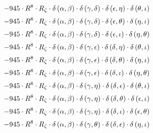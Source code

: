 \begin{subequations}
\begin{gather}
 \\[0.2em] \notag 		 - 945 \cdot R^{8} \cdot R_{\zeta{}} \cdot \delta{}\left(\alpha{}, \beta{}\right) \cdot \delta{}\left(\gamma{}, \delta{}\right) \cdot \delta{}\left(\epsilon{}, \eta{}\right) \cdot \delta{}\left(\theta{}, \iota{}\right) 
 \\[0.2em] \notag 		 - 945 \cdot R^{8} \cdot R_{\zeta{}} \cdot \delta{}\left(\alpha{}, \beta{}\right) \cdot \delta{}\left(\gamma{}, \delta{}\right) \cdot \delta{}\left(\epsilon{}, \theta{}\right) \cdot \delta{}\left(\eta{}, \iota{}\right) 
 \\[0.2em] \notag 		 - 945 \cdot R^{8} \cdot R_{\zeta{}} \cdot \delta{}\left(\alpha{}, \beta{}\right) \cdot \delta{}\left(\gamma{}, \delta{}\right) \cdot \delta{}\left(\epsilon{}, \iota{}\right) \cdot \delta{}\left(\eta{}, \theta{}\right) 
 \\[0.2em] \notag 		 - 945 \cdot R^{8} \cdot R_{\zeta{}} \cdot \delta{}\left(\alpha{}, \beta{}\right) \cdot \delta{}\left(\gamma{}, \epsilon{}\right) \cdot \delta{}\left(\delta{}, \eta{}\right) \cdot \delta{}\left(\theta{}, \iota{}\right) 
 \\[0.2em] \notag 		 - 945 \cdot R^{8} \cdot R_{\zeta{}} \cdot \delta{}\left(\alpha{}, \beta{}\right) \cdot \delta{}\left(\gamma{}, \epsilon{}\right) \cdot \delta{}\left(\delta{}, \theta{}\right) \cdot \delta{}\left(\eta{}, \iota{}\right) 
 \\[0.2em] \notag 		 - 945 \cdot R^{8} \cdot R_{\zeta{}} \cdot \delta{}\left(\alpha{}, \beta{}\right) \cdot \delta{}\left(\gamma{}, \epsilon{}\right) \cdot \delta{}\left(\delta{}, \iota{}\right) \cdot \delta{}\left(\eta{}, \theta{}\right) 
 \\[0.2em] \notag 		 - 945 \cdot R^{8} \cdot R_{\zeta{}} \cdot \delta{}\left(\alpha{}, \beta{}\right) \cdot \delta{}\left(\gamma{}, \eta{}\right) \cdot \delta{}\left(\delta{}, \epsilon{}\right) \cdot \delta{}\left(\theta{}, \iota{}\right) 
 \\[0.2em] \notag 		 - 945 \cdot R^{8} \cdot R_{\zeta{}} \cdot \delta{}\left(\alpha{}, \beta{}\right) \cdot \delta{}\left(\gamma{}, \eta{}\right) \cdot \delta{}\left(\delta{}, \theta{}\right) \cdot \delta{}\left(\epsilon{}, \iota{}\right) 
 \\[0.2em] \notag 		 - 945 \cdot R^{8} \cdot R_{\zeta{}} \cdot \delta{}\left(\alpha{}, \beta{}\right) \cdot \delta{}\left(\gamma{}, \eta{}\right) \cdot \delta{}\left(\delta{}, \iota{}\right) \cdot \delta{}\left(\epsilon{}, \theta{}\right) 
 \\[0.2em] \notag 		 - 945 \cdot R^{8} \cdot R_{\zeta{}} \cdot \delta{}\left(\alpha{}, \beta{}\right) \cdot \delta{}\left(\gamma{}, \theta{}\right) \cdot \delta{}\left(\delta{}, \epsilon{}\right) \cdot \delta{}\left(\eta{}, \iota{}\right) 

\end{gather}
\end{subequations}
